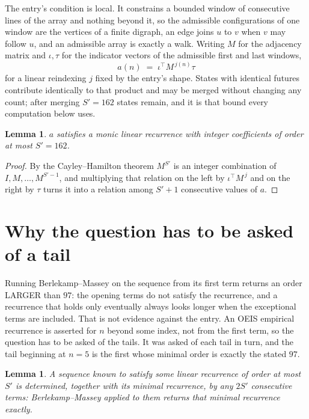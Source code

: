 \documentclass[11pt,a4paper]{article}
\theoremstyle{plain}
\newtheorem{lemma}[theorem]{Lemma}
\theoremstyle{definition}
\begin{document}
The entry's condition is local. It constrains a bounded window of consecutive lines of the
array and nothing beyond it, so the admissible configurations of one window are the vertices of
a finite digraph, an edge joins $u$ to $v$ when $v$ may follow $u$, and an admissible array is
exactly a walk. Writing $M$ for the adjacency matrix and $\iota,\tau$ for the indicator vectors
of the admissible first and last windows,
\[
a(n)\;=\;\iota^{\!\top}M^{\,j(n)}\tau
\]
for a linear reindexing $j$ fixed by the entry's shape. States with identical futures
contribute identically to that product and may be merged without changing any count; after
merging $S'=162$ states remain, and it is that bound every computation below uses.

\begin{lemma}\label{lem:cf}
$a$ satisfies a monic linear recurrence with integer coefficients of order at most $S'=162$.
\end{lemma}

\begin{proof}
By the Cayley--Hamilton theorem $M^{S'}$ is an integer combination of $I,M,\dots,M^{S'-1}$,
and multiplying that relation on the left by $\iota^{\!\top}M^{\,j}$ and on the right by
$\tau$ turns it into a relation among $S'+1$ consecutive values of $a$.
\end{proof}

\section{Why the question has to be asked of a tail}

Running Berlekamp--Massey on the sequence from its first term returns an order LARGER than $97$: the opening terms do not satisfy the recurrence, and a recurrence that holds only eventually always looks longer when the exceptional terms are included. That is not evidence against the entry. An OEIS empirical recurrence is asserted for $n$ beyond some index, not from the first term, so the question has to be asked of the tails. It was asked of each tail in turn, and the tail beginning at $n=5$ is the first whose minimal order is exactly the stated $97$.

\begin{lemma}\label{lem:bm}
A sequence known to satisfy some linear recurrence of order at most $S'$ is determined,
together with its minimal recurrence, by any $2S'$ consecutive terms: Berlekamp--Massey applied
to them returns that minimal recurrence exactly.
\end{lemma}
\end{document}
